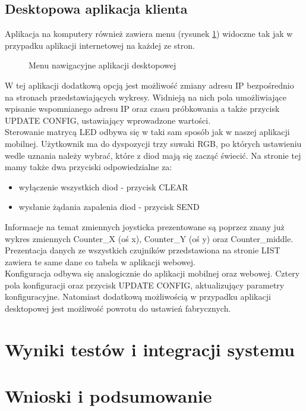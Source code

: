 \documentclass[11pt, a4paper]{article}
\begin{document}
\subsection{Desktopowa aplikacja klienta}
Aplikacja na komputery również zawiera menu (rysunek \ref{fig:fig4}) widoczne tak jak w przypadku aplikacji internetowej na każdej ze stron. \\
\begin{figure}[H]
	\caption{Menu nawigacyjne aplikacji desktopowej}
	\label{fig:fig4}
\end{figure}
W tej aplikacji dodatkową opcją jest możliwość zmiany adresu IP bezpośrednio na stronach przedstawiających wykresy. Widnieją na nich pola umożliwiające wpisanie wspomnianego adresu IP oraz czasu próbkowania a także przycisk UPDATE CONFIG, ustawiający wprowadzone wartości. \\
Sterowanie matrycą LED odbywa się w taki sam sposób jak w naszej aplikacji mobilnej. Użytkownik ma do dyspozycji trzy suwaki RGB, po których ustawieniu wedle uznania należy wybrać, które z diod mają się zacząć świecić. Na stronie tej mamy także dwa przyciski odpowiedzialne za: 
\begin{itemize}
\item wyłączenie wszystkich diod - przycisk CLEAR
\item wysłanie żądania zapalenia diod - przycisk SEND
\end{itemize}

Informacje na temat zmiennych joysticka prezentowane są poprzez znany już wykres zmiennych Counter\_X (oś x), Counter\_Y (oś y) oraz Counter\_middle. \\
Prezentacja danych ze wszystkich czujników przedstawiona na stronie LIST zawiera te same dane co tabela w aplikacji webowej. \\
Konfiguracja odbywa się analogicznie do aplikacji mobilnej oraz webowej. Cztery pola konfiguracji oraz przycisk UPDATE CONFIG, aktualizujący parametry konfiguracyjne. Natomiast dodatkową możliwością w przypadku aplikacji desktopowej jest możliwość powrotu do ustawień fabrycznych.
\newpage

\section{Wyniki testów i integracji systemu}

\newpage

\section{Wnioski i podsumowanie}


\newpage

\printbibliography[heading=bibintoc]
\end{document}
